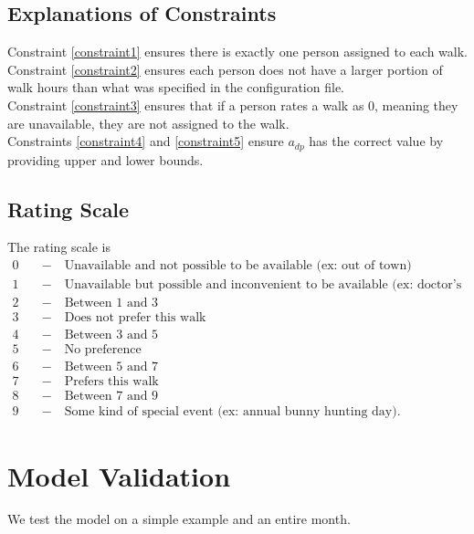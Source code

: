 \documentclass{notes}
\begin{document}
\subsection*{Explanations of Constraints}
Constraint \ref{constraint1} ensures there is exactly one person assigned to each walk.\\

Constraint \ref{constraint2} ensures each person does not have a larger portion of walk hours than what was specified in the configuration file.\\

Constraint \ref{constraint3} ensures that if a person rates a walk as $0$, meaning they are unavailable, they are not assigned to the walk.\\

Constraints \ref{constraint4} and \ref{constraint5} ensure $a_{dp}$ has the correct value by providing upper and lower bounds.
\subsection*{Rating Scale}
The rating scale is
\begin{align*}
	\text{0}\quad&-\quad\text{Unavailable and not possible to be available (ex: out of town)}\\
	\text{1}\quad&-\quad\text{Unavailable but possible and inconvenient to be available (ex: doctor's appointment)}\\
	\text{2}\quad&-\quad\text{Between 1 and 3}\\
	\text{3}\quad&-\quad\text{Does not prefer this walk}\\
	\text{4}\quad&-\quad\text{Between 3 and 5}\\
	\text{5}\quad&-\quad\text{No preference}\\
	\text{6}\quad&-\quad\text{Between 5 and 7}\\
	\text{7}\quad&-\quad\text{Prefers this walk}\\
	\text{8}\quad&-\quad\text{Between 7 and 9}\\
	\text{9}\quad&-\quad\text{Some kind of special event (ex: annual bunny hunting day).}
\end{align*}
\section*{Model Validation}
We test the model on a simple example and an entire month.
\end{document}
